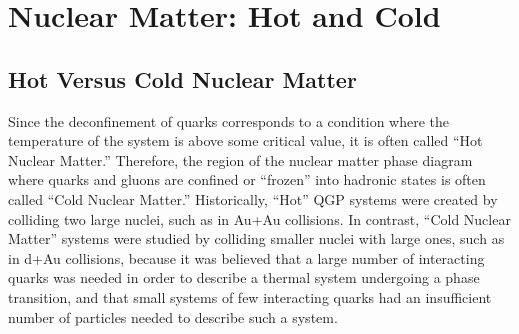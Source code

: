 

\chapter{Nuclear Matter: Hot and Cold} %
\section{Hot Versus Cold Nuclear Matter}
Since the deconfinement of quarks corresponds to a condition where the temperature of the system is above some critical value, it is often called ``Hot Nuclear Matter.'' Therefore, the region of the nuclear matter phase diagram where quarks and gluons are confined or ``frozen'' into hadronic states is often called ``Cold Nuclear Matter.'' Historically, ``Hot'' QGP systems were created by colliding two large nuclei, such as in Au+Au collisions. In contrast,  ``Cold Nuclear Matter'' systems were studied by colliding smaller nuclei with large ones, such as in d+Au collisions, because it was believed that a large number of interacting quarks was needed in order to describe a thermal system undergoing a phase transition, and that small systems of few interacting quarks had an insufficient number of particles needed to describe such a system.

